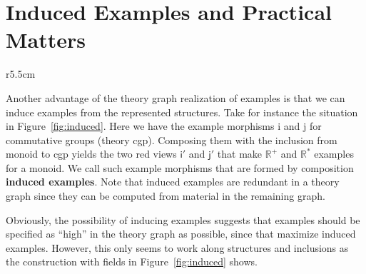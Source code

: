 \documentclass[11pt]{bluenote}
\def\defemph{\textbf}
\begin{document}
\section{Induced Examples and Practical Matters}

\begin{wrapfigure}r{5.5cm}\vspace*{-1.5em}
  \caption{Induced Examples}\label{fig:induced}\vspace*{-1em}
\end{wrapfigure}
Another advantage of the theory graph realization of examples is that we can induce
examples from the represented structures. Take for instance the situation in
Figure~\ref{fig:induced}. Here we have the example morphisms \textsf{i} and \textsf{j} for
commutative groups (theory \textsf{cgp}). Composing them with the inclusion from
\textsf{monoid} to \textsf{cgp} yields the two red views $\mathsf{i}'$ and $\mathsf{j}'$
that make $\mathbb{R}^+$ and $\mathbb{R}^*$ examples for a monoid. We call such example
morphisms that are formed by composition \defemph{induced examples}. Note that induced
examples are redundant in a theory graph since they can be computed from material in the
remaining graph.

Obviously, the possibility of inducing examples suggests that examples should be specified
as ``high'' in the theory graph as possible, since that maximize induced
examples. However, this only seems to work along structures and inclusions as the
construction with fields in Figure~\ref{fig:induced} shows.
\end{document}
